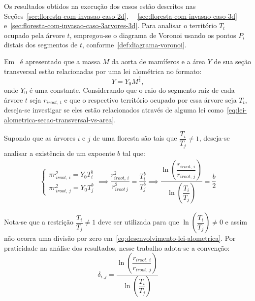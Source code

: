 \clearpage

Os resultados obtidos na execução dos casos estão descritos 
nas Seções~\ref{sec:floresta-com-invasao-caso-2d},
\ ~\ref{sec:floresta-com-invasao-caso-3d} e~\ref{sec:floresta-com-invasao-caso-3arvores-3d}. 
Para analisar o território $T_t$ ocupado pela árvore $t$, 
empregou-se o diagrama de Voronoi usando os pontos $P_i$ 
distais dos segmentos de $t$, conforme~\eqref{def:diagrama-voronoi}. 

Em~\cite{West1997} é apresentado que a massa $M$ da aorta de mamíferos 
e a área $Y$ de sua seção transversal estão relacionadas por uma lei alométrica no
formato:
\begin{equation}
  Y = Y_0 M^\frac{3}{4},
  \label{eq:lei-alometrica-secao-transversal-vs-area}
\end{equation}
onde $Y_0$ é uma constante. Considerando que o raio do segmento raiz de cada árvore $t$ 
seja $r_{iroot,\,t}$ e que o respectivo território ocupado por essa árvore seja $T_t$, 
deseja-se investigar se eles estão relacionados através de alguma lei 
como~\eqref{eq:lei-alometrica-secao-transversal-vs-area}. 

Supondo que as árvores $i$ e $j$ de uma floresta são tais 
que $\dfrac{T_i}{T_j} \neq 1$, deseja-se analisar a existência de um expoente
$b$ tal que:
\begin{eqnarray}
  \begin{cases}
    \pi r_{iroot,\,i}^2 = Y_0T_i^{b}\\
    \pi r_{iroot,\,j}^2 = Y_0T_j^{b}
  \end{cases}\implies
  \dfrac{r_{iroot,\,i}^2}{r_{iroot\,j}^2} = \dfrac{T_i^{b}}{T_j^{b}}
  \implies
  \dfrac{\ln\left(\dfrac{r_{iroot,\,i}}{r_{iroot,\,j}}\right)}{\ln\left(\dfrac{T_i}{T_j}\right)} = \dfrac{b}{2}
  \label{eq:desenvolvimento-lei-alometrica}
\end{eqnarray}

Nota-se que a restrição $\dfrac{T_i}{T_j} \neq 1$ deve ser utilizada 
para que  $\ln\left(\dfrac{T_i}{T_j}\right) \neq 0$ e assim não ocorra uma divisão 
por zero em~\eqref{eq:desenvolvimento-lei-alometrica}. Por praticidade na 
análise dos resultados, nesse trabalho adota-se a convenção:
\begin{equation}
  \delta_{i, j} = \dfrac{\ln\left(\dfrac{r_{iroot,\,i}}{r_{iroot,\,j}}\right)}{\ln\left(\dfrac{T_i}{T_j}\right)}
  \label{eq:lei-alometrica-delta-ij}
\end{equation}

\clearpage

